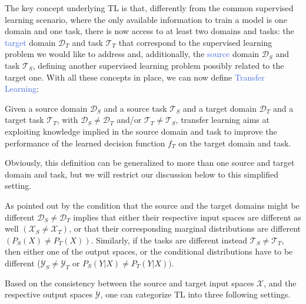 The key concept underlying TL is that, differently from the common supervised learning scenario, where the only available information to train a model is one domain and one task, there is now access to at least two domains and tasks: the \textcolor{RoyalBlue}{target} domain $\mathcal{D}_T$ and task $\mathcal{T}_T$ that correspond to the supervised learning problem we would like to address and, additionally, the \textcolor{RoyalBlue}{source} domain $\mathcal{D}_S$  and task $\mathcal{T}_S$, defining another supervised learning problem possibly related to the target one. With all these concepts in place, we can now define \textcolor{RoyalBlue}{Transfer Learning}:
\begin{definition}
Given a source domain $\mathcal{D}_S$ and a source task $\mathcal{T}_S$ and a target domain $\mathcal{D}_T$ and a target task $\mathcal{T}_T$, with $\mathcal{D}_{S}\neq\mathcal{D}_{T}$ and/or $\mathcal{T}_T\neq\mathcal{T}_S$, transfer learning aims at exploiting knowledge implied in the source domain and task to improve the performance of the learned decision function $f_T$ on the target domain and task.
\end{definition}
Obviously, this definition can be generalized to more than one source and target domain and task, but we will restrict our discussion below to this simplified setting.

As pointed out by \citet{pan2009survey} the condition that the source and the target domains might be different $\mathcal{D}_S \neq \mathcal{D}_T$ implies that either their respective input spaces are different as well $(\mathcal{X}_S\neq\mathcal{X}_T)$, or that their corresponding marginal distributions are different $(P_S(X)\neq P_T(X))$. Similarly, if the tasks are different instead $\mathcal{T}_S\neq\mathcal{T}_T$, then either one of the output spaces, or the conditional distributions have to be different ($\mathcal{Y}_S\neq\mathcal{Y}_T$ or $P_S(Y|X)\neq P_T(Y|X))$.

Based on the consistency between the source and target input spaces $\mathcal{X}$, and the respective output spaces $\mathcal{Y}$, one can categorize TL into three following settings.

